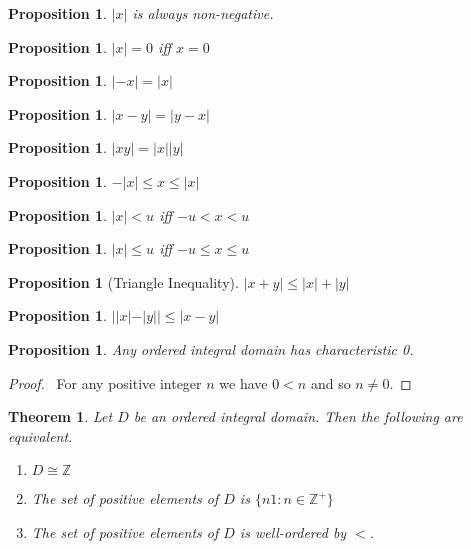 \documentclass{article}
\let\qed\relax
\newtheorem{proposition}[axiom]{Proposition}
\newtheorem{theorem}[axiom]{Theorem}
\theoremstyle{definition}
\begin{document}
    \begin{proposition}
        $|x|$ is always non-negative.
    \end{proposition}

    \begin{proposition}
        $|x| = 0$ iff $x = 0$
    \end{proposition}

    \begin{proposition}
        $|-x| = |x|$
    \end{proposition}

    \begin{proposition}
        $|x-y| = |y-x|$
    \end{proposition}

    \begin{proposition}
        $|xy| = |x||y|$
    \end{proposition}

    \begin{proposition}
        $-|x| \leq x \leq |x|$
    \end{proposition}

    \begin{proposition}
        $|x| < u$ iff $-u < x < u$
    \end{proposition}

    \begin{proposition}
        $|x| \leq u$ iff $-u \leq x \leq u$
    \end{proposition}

    \begin{proposition}[Triangle Inequality]
        $|x + y| \leq |x| + |y|$
    \end{proposition}

    \begin{proposition}
        $||x| - |y|| \leq |x-y|$
    \end{proposition}

    \begin{proposition}
        Any ordered integral domain has characteristic 0.
    \end{proposition}

    \begin{proof}
        \pf\ For any positive integer $n$ we have $0 < n$ and so $n \neq 0$. \qed
    \end{proof}

    \begin{theorem}
        Let $D$ be an ordered integral domain. Then the following are equivalent.
        \begin{enumerate}
            \item $D \cong \mathbb{Z}$
            \item The set of positive elements of $D$ is $\{ n1 : n \in \mathbb{Z}^+ \}$
            \item The set of positive elements of $D$ is well-ordered by $<$.
        \end{enumerate}
    \end{theorem}
\end{document}
